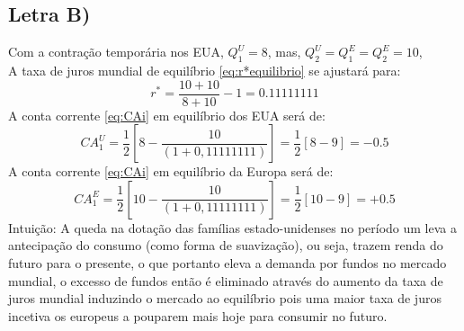 \documentclass{article}
\begin{document}
\subsection*{Letra B)}
Com a contração temporária nos EUA, $Q_1^{U}=8$, mas, $Q_2^U=Q_1^E=Q_2^E=10$,\\
A taxa de juros mundial de equilíbrio \eqref{eq:r*equilibrio} se ajustará para:
\begin{equation}
    r^*=\frac{10+10}{8 + 10}-1 = 0.11111111
\end{equation}
A conta corrente \eqref{eq:CAi} em equilíbrio dos EUA será de:
\begin{equation}
    CA_1^{U}=\frac{1}{2}\left[8-\frac{10}{(1+0,11111111)}\right] = \frac{1}{2}\left[8-9\right] = - 0.5
\end{equation}
A conta corrente \eqref{eq:CAi} em equilíbrio da Europa será de:
\begin{equation}
    CA_1^{E}=\frac{1}{2}\left[10-\frac{10}{(1+0,11111111)}\right] = \frac{1}{2}\left[10-9\right] = + 0.5
\end{equation}
Intuição:
A queda na dotação das famílias estado-unidenses no período um leva a antecipação do consumo (como forma de suavização), ou seja, trazem renda do futuro para o presente, o que portanto eleva a demanda por fundos no mercado mundial, o excesso de fundos então é eliminado através do aumento da taxa de juros mundial induzindo o mercado ao equilíbrio pois uma maior taxa de juros incetiva os europeus a pouparem mais hoje para consumir no futuro.
\end{document}

